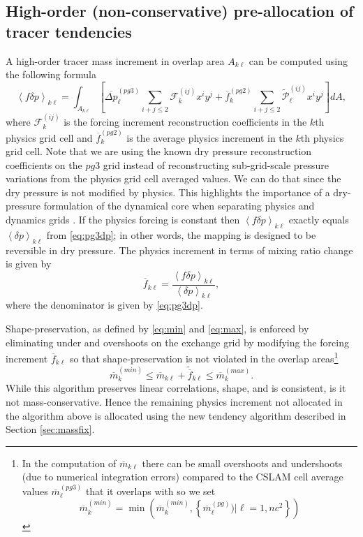 \documentclass{agujournal}
\begin{document}
\subsection{High-order (non-conservative) pre-allocation of tracer tendencies}
A high-order tracer mass increment in overlap area $A_{k\ell}$ can be computed using the following formula
\begin{equation}
\label{eq:mp3}
\left< f\delta p\right>_{k\ell}=\int_{A_{k\ell}}\left[ \overline{\Delta p}_\ell^{(pg3)}\sum_{i+j\le 2}{\mathcal{F}}^{(ij)}_k x^{i}y^{j}+{\overline{f}}_k^{(pg2)}\sum_{i+j\le 2}{\widetilde{{\mathcal{P}}}}^{(ij)}_\ell x^{i}y^{j}\right] dA,
\end{equation}
where $\mathcal{F}^{(ij)}_k$ is the forcing increment reconstruction coefficients in the $k$th physics grid cell and ${\overline{f}}_k^{(pg2)}$ is the average physics increment in the $k$th physics grid cell. Note that we are using the known dry pressure reconstruction coefficients on the $pg3$ grid instead of reconstructing sub-grid-scale pressure variations from the physics grid cell averaged values. We can do that since the dry pressure is not modified by physics. This highlights the importance of a dry-pressure formulation of the dynamical core when separating physics and dynamics grids \citep{LetAl2018JAMES}. If the physics forcing is constant then $\left< f\delta p\right>_{k\ell}$ exactly equals $\left<\delta p\right>_{k\ell}$ from \eqref{eq:pg3dp}; in other words, the mapping is designed to be reversible in dry pressure. The physics increment in terms of mixing ratio change is given by
\begin{equation}
\label{eq:pg3fq}
\overline{f}_{k\ell}=\frac{\left< f\delta p\right>_{k\ell}}{\left<\delta p\right>_{k\ell}},
\end{equation}
where the denominator is given by \eqref{eq:pg3dp}.

Shape-preservation, as defined by \eqref{eq:min} and \eqref{eq:max}, is enforced by eliminating under and overshoots on the exchange grid by modifying the forcing increment $\overline{f}_{k\ell}$ so that shape-preservation is not violated in the overlap areas{\footnote{In the computation of $\overline{m}_{k\ell}$ there can be small overshoots and undershoots (due to numerical integration errors) compared to the CSLAM cell average values $\overline{m}^{(pg3)}_\ell$ that it overlaps with so we set
\begin{equation}
\overline{m}_k^{(min)}=\min \left( \overline{m}_k^{(min)},\left\{ \overline{m}^{(pg)}_\ell)|\ell=1,nc^2\right\} \right)
\end{equation}}}
\begin{equation}
\overline{m}_k^{(min)} \le \overline{m}_{k\ell}+\widetilde{\overline{f}}_{k\ell} \le \overline{m}_k^{(max)}.
\end{equation}
While this algorithm preserves linear correlations, shape, and is consistent, is it not mass-conservative. Hence the remaining physics increment not allocated in the algorithm above is allocated using the new tendency algorithm described in Section \ref{sec:massfix}.
\end{document}
